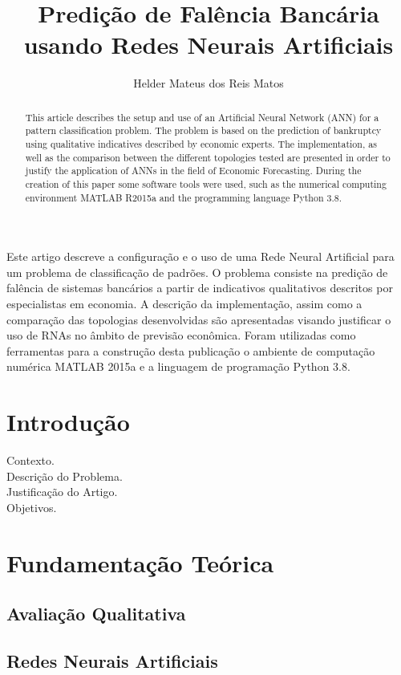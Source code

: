 \documentclass[12pt]{article}
\title{Predição de Falência Bancária\\usando Redes Neurais Artificiais}
\author{Helder Mateus dos Reis Matos\inst{1}}
\begin{document}
 

\maketitle

\begin{abstract}
This article describes the setup and use of an Artificial Neural Network (ANN) for a pattern classification problem. The problem is based on the prediction of bankruptcy using qualitative indicatives described by economic experts. The implementation, as well as the comparison between the different topologies tested are presented in order to justify the application of ANNs in the field of Economic Forecasting. During the creation of this paper some software tools were used, such as the numerical computing environment MATLAB R2015a and the programming language Python 3.8.
\end{abstract}

\begin{resumo}
Este artigo descreve a configuração e o uso de uma Rede Neural Artificial para um problema de classificação de padrões.
O problema consiste na predição de falência de sistemas bancários a partir de indicativos qualitativos descritos por especialistas em economia. A descrição da implementação, assim como a comparação das topologias desenvolvidas são apresentadas visando justificar o uso de RNAs no âmbito de previsão econômica. Foram utilizadas como ferramentas para a construção desta publicação o ambiente de computação numérica MATLAB 2015a e a linguagem de programação Python 3.8.
\end{resumo}


\section{Introdução}
Contexto.\\
Descrição do Problema.\\
Justificação do Artigo.\\
Objetivos.\\

\section{Fundamentação Teórica}
	\subsection{Avaliação Qualitativa}
	\cite{myoung:03}
	\subsection{Redes Neurais Artificiais}
	\cite{haykin}
	
\end{document}
